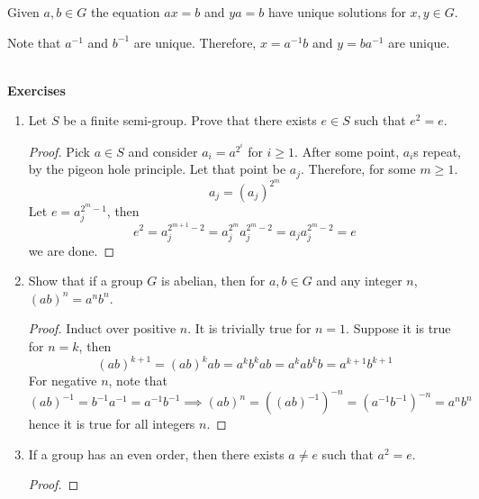 \begin{lemma}
    Given \(a,b \in G\) the equation \(ax = b\) and \(ya = b\) have unique solutions for \(x,y \in G\).
\end{lemma}

\begin{prooflemma}
    Note that \(a^{-1}\) and \(b^{-1}\) are unique. Therefore, \(x = a^{-1}b\) and \(y = ba^{-1}\) are unique.
\end{prooflemma}
\ \\ 
{\Large{\textbf{Exercises}}}
\begin{enumerate}
    \item Let \(S\) be a finite semi-group. Prove that there exists \(e \in S\) such that \(e^2 = e\).
    \begin{proof}
        Pick \(a \in S\) and consider \(a_i = a^{2^i}\) for \(i \geq 1\). After some point, \(a_i\)s repeat, by the pigeon hole principle. Let that point be \(a_j\). Therefore, for some \(m \geq 1\).
        \begin{equation*}
            a_j = (a_j)^{2^m}
        \end{equation*}
        Let \(e = a_j^{2^m - 1}\), then
        \begin{equation*}
            e^2 = a_j^{2^{m+1} - 2} = a_j^{2^{m}} a_j^{2^m - 2} = a_j a_j^{2^m - 2} = e
        \end{equation*}
        we are done.
    \end{proof}
    \item Show that if a group \(G\) is abelian, then for \(a,b \in G\) and any integer \(n\), \((ab)^n = a^n b^n\).
    \begin{proof}
        Induct over positive \(n\). It is trivially true for \(n = 1\). Suppose it is true for \(n = k\), then 
        \begin{equation*}
            (ab)^{k+1} = (ab)^k ab = a^k b^k a b = a^{k} a b^k b = a^{k+1}b^{k+1}
        \end{equation*}
        For negative \(n\), note that 
        \begin{equation*}
            (ab)^{-1} = b^{-1} a^{-1} = a^{-1} b^{-1} \implies (ab)^{n} = ((ab)^{-1})^{-n} = (a^{-1} b^{-1})^{-n} = a^{n} b^{n}
        \end{equation*}
        hence it is true for all integers \(n\).
    \end{proof}
    \item If a group has an even order, then there exists \(a \neq e\) such that \(a^2 = e\).
    \begin{proof}

\end{proof}
\end{enumerate}
